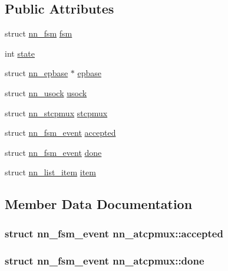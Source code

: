 \subsection*{Public Attributes}
\begin{DoxyCompactItemize}
\item 
struct \hyperlink{structnn__fsm}{nn\+\_\+fsm} \hyperlink{structnn__atcpmux_a26d4e8b2d6c8b531764ffb49c43b4c3d}{fsm}
\item 
int \hyperlink{structnn__atcpmux_aef404e44445e0ee8ed0f2c71a5381043}{state}
\item 
struct \hyperlink{structnn__epbase}{nn\+\_\+epbase} $\ast$ \hyperlink{structnn__atcpmux_a483609219bb585fbf49fc33a84975cbe}{epbase}
\item 
struct \hyperlink{structnn__usock}{nn\+\_\+usock} \hyperlink{structnn__atcpmux_a098c32746a2c8c7ae2fc6df099306566}{usock}
\item 
struct \hyperlink{structnn__stcpmux}{nn\+\_\+stcpmux} \hyperlink{structnn__atcpmux_a0d71d6b00d9a8487c66972a95dd85a1d}{stcpmux}
\item 
struct \hyperlink{structnn__fsm__event}{nn\+\_\+fsm\+\_\+event} \hyperlink{structnn__atcpmux_abfa2adeace4b3e50ad652211011cdbdf}{accepted}
\item 
struct \hyperlink{structnn__fsm__event}{nn\+\_\+fsm\+\_\+event} \hyperlink{structnn__atcpmux_a70ec373c482cb06cddf83c7a8cbe64fe}{done}
\item 
struct \hyperlink{structnn__list__item}{nn\+\_\+list\+\_\+item} \hyperlink{structnn__atcpmux_a61556270226d5a637429c5436715b295}{item}
\end{DoxyCompactItemize}


\subsection{Member Data Documentation}
\subsubsection[{accepted}]{\setlength{\rightskip}{0pt plus 5cm}struct {\bf nn\+\_\+fsm\+\_\+event} nn\+\_\+atcpmux\+::accepted}\hypertarget{structnn__atcpmux_abfa2adeace4b3e50ad652211011cdbdf}{}\label{structnn__atcpmux_abfa2adeace4b3e50ad652211011cdbdf}
\subsubsection[{done}]{\setlength{\rightskip}{0pt plus 5cm}struct {\bf nn\+\_\+fsm\+\_\+event} nn\+\_\+atcpmux\+::done}\hypertarget{structnn__atcpmux_a70ec373c482cb06cddf83c7a8cbe64fe}{}\label{structnn__atcpmux_a70ec373c482cb06cddf83c7a8cbe64fe}
